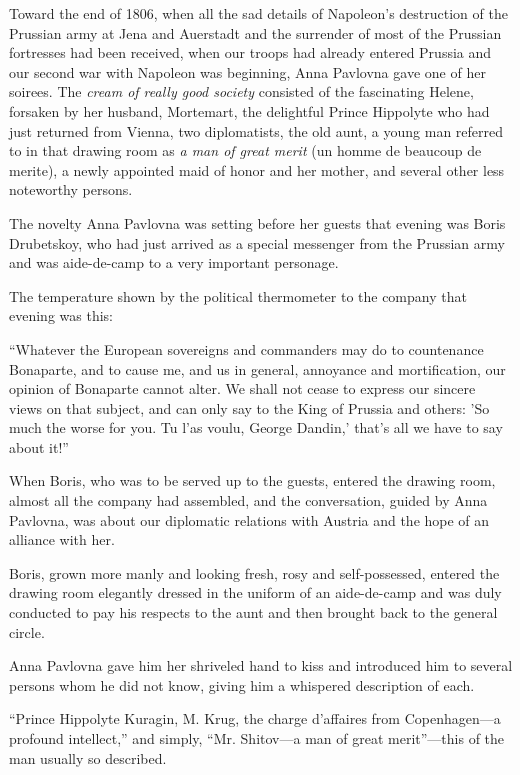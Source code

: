 Toward the end of 1806, when all the sad details of Napoleon's
destruction of the Prussian army at Jena and Auerstadt and the
surrender of most of the Prussian fortresses had been received,
when our troops had already entered Prussia and our second war
with Napoleon was beginning, Anna Pavlovna gave one of her
soirees. The \emph{cream of really good society} consisted of the
fascinating Helene, forsaken by her husband, Mortemart, the
delightful Prince Hippolyte who had just returned from Vienna,
two diplomatists, the old aunt, a young man referred to in that
drawing room as \emph{a man of great merit} (un homme de beaucoup de
merite), a newly appointed maid of honor and her mother, and
several other less noteworthy persons.

The novelty Anna Pavlovna was setting before her guests that
evening was Boris Drubetskoy, who had just arrived as a special
messenger from the Prussian army and was aide-de-camp to a very
important personage.

The temperature shown by the political thermometer to the company
that evening was this:

``Whatever the European sovereigns and commanders may do to
countenance Bonaparte, and to cause me, and us in general,
annoyance and mortification, our opinion of Bonaparte cannot
alter. We shall not cease to express our sincere views on that
subject, and can only say to the King of Prussia and others: 'So
much the worse for you. Tu l'as voulu, George Dandin,' that's all
we have to say about it!''

When Boris, who was to be served up to the guests, entered the
drawing room, almost all the company had assembled, and the
conversation, guided by Anna Pavlovna, was about our diplomatic
relations with Austria and the hope of an alliance with her.

Boris, grown more manly and looking fresh, rosy and
self-possessed, entered the drawing room elegantly dressed in the
uniform of an aide-de-camp and was duly conducted to pay his
respects to the aunt and then brought back to the general circle.

Anna Pavlovna gave him her shriveled hand to kiss and introduced
him to several persons whom he did not know, giving him a
whispered description of each.

``Prince Hippolyte Kuragin, M. Krug, the charge d'affaires from
Co\-pen\-ha\-gen---a profound intellect,'' and simply, ``Mr. Shitov---a
man of great merit''---this of the man usually so described.

